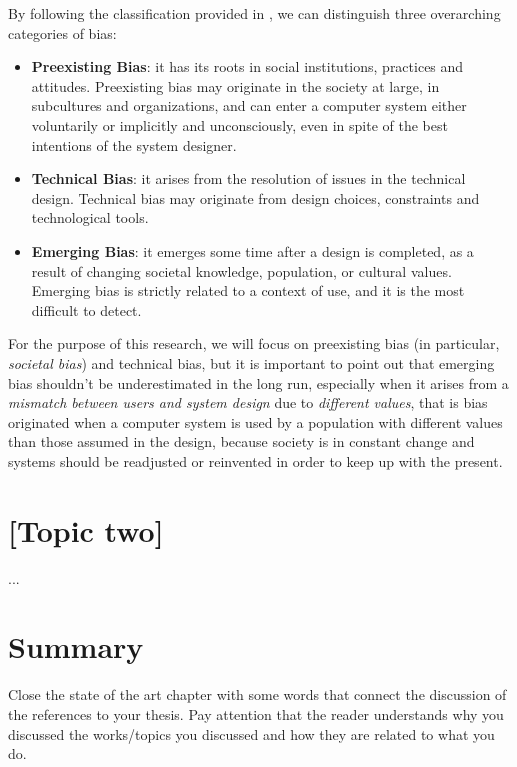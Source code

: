 By following the classification provided in \cite{friedman2017bias}, we can distinguish three overarching categories of bias:
\begin{itemize}
\item \textbf{Preexisting Bias}: it has its roots in social institutions, practices and attitudes. Preexisting bias may originate in the society at large, in subcultures and organizations, and can enter a computer system either voluntarily or implicitly and unconsciously, even in spite of the best intentions of the system designer.
\item \textbf{Technical Bias}: it arises from the resolution of issues in the technical design. Technical bias may originate from design choices, constraints and technological tools.
\item \textbf{Emerging Bias}: it emerges some time after a design is completed, as a result of changing societal knowledge, population, or cultural values. Emerging bias is strictly related to a context of use, and it is the most difficult to detect.
\end{itemize}

For the purpose of this research, we will focus on preexisting bias (in particular, \textit{societal bias}) and technical bias, but it is important to point out that emerging bias shouldn't be underestimated in the long run, especially when it arises from a \textit{mismatch between users and system design} due to \textit{different values}, that is bias originated when a computer system is used by a population with different values than those assumed in the design, because society is in constant change and systems should be readjusted or reinvented in order to keep up with the present.

\section{[Topic two]}
...

\section{Summary}
Close the state of the art chapter with some words that connect the discussion of the references to your thesis. Pay attention that the reader understands why you discussed the works/topics you discussed and how they are related to what you do.


